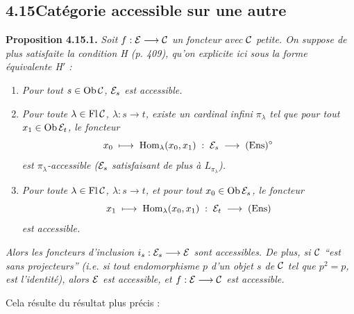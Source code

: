 \subsection*{4.15\quad Catégorie accessible sur une autre}

\textbf{Proposition 4.15.1.} \textit{Soit $f : \mathcal{E} \longrightarrow \mathcal{C}$ un foncteur avec $\mathcal{C}$ petite. On suppose de plus satisfaite la condition H (p. 409), qu'on explicite ici sous la forme équivalente H$'$ :}
\begin{enumerate}
\item[\textit{H 1)}] \textit{Pour tout $s \in \operatorname{Ob}\mathcal{C}$, $\mathcal{E}_s$ est accessible.}
\item[\textit{H 2)}] \textit{Pour toute $\lambda \in \operatorname{Fl}\mathcal{C}$, $\lambda : s \longrightarrow t$, existe un cardinal infini $\pi_\lambda$ tel que pour tout $x_1 \in \operatorname{Ob}\mathcal{E}_t$, le foncteur}
\[
x_0 \;\longmapsto\; \operatorname{Hom}_\lambda(x_0,x_1) \;:\; \mathcal{E}_s \;\longrightarrow\; (\mathrm{Ens})^\circ
\]
\textit{est $\pi_\lambda$-accessible ($\mathcal{E}_s$ satisfaisant de plus à $L_{\pi_\lambda}$).}
\item[\textit{H 3)}] \textit{Pour toute $\lambda \in \operatorname{Fl}\mathcal{C}$, $\lambda : s \longrightarrow t$, et pour tout $x_0 \in \operatorname{Ob}\mathcal{E}_s$, le foncteur}
\[
x_1 \;\longmapsto\; \operatorname{Hom}_\lambda(x_0,x_1) \;:\; \mathcal{E}_t \;\longrightarrow\; (\mathrm{Ens})
\]
\textit{est accessible.}
\end{enumerate}
\textit{Alors les foncteurs d'inclusion $i_s : \mathcal{E}_s \longrightarrow \mathcal{E}$ sont accessibles. De plus, si $\mathcal{C}$ ``est sans projecteurs'' (i.e. si tout endomorphisme $p$ d'un objet $s$ de $\mathcal{C}$ tel que $p^2 = p$, est l'identité), alors $\mathcal{E}$ est accessible, et $f : \mathcal{E} \longrightarrow \mathcal{C}$ est accessible.}

Cela résulte du résultat plus précis :


